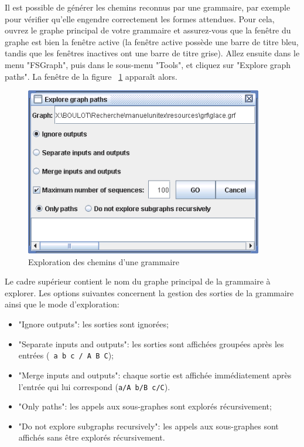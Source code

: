 Il est possible de générer les chemins reconnus par une grammaire, par exemple pour
vérifier qu’elle engendre correctement les formes attendues. Pour cela, ouvrez le graphe
principal de votre grammaire et assurez-vous que la fenêtre du graphe est bien la fenêtre active
(la fenêtre active possède une barre de titre bleu, tandis que les fenêtres inactives ont une
barre de titre grise). Allez ensuite dans le menu "FSGraph", puis dans le sous-menu "Tools",
et cliquez sur "Explore graph paths". La fenêtre de la figure 
~\ref{fig-explore-graph-paths} apparaît alors.


\begin{figure}[!ht]
\begin{center}
\includegraphics[width=10.4cm]{resources/img/fig6-18.png}
\caption{Exploration des chemins d’une grammaire\label{fig-explore-graph-paths}}
\end{center}
\end{figure}

\bigskip
\noindent Le cadre supérieur contient le nom du graphe principal de la grammaire à explorer.
Les options suivantes concernent la gestion des sorties de la grammaire ainsi que le mode
d’exploration:


\begin{itemize}
  \item "Ignore outputs": les sorties sont ignorées;
  \item "Separate inputs and outputs": les sorties sont affichées groupées après les entrées
  (\verb$ a b c / A B C$);
  \item "Merge inputs and outputs": chaque sortie est affichée immédiatement après l’entrée 
  	  qui lui correspond
  (\verb$a/A b/B c/C$).
  \item "Only paths": les appels aux sous-graphes sont explorés récursivement;
  \item "Do not explore subgraphs recursively": les appels aux sous-graphes sont affichés sans
être explorés récursivement.
\end{itemize}

